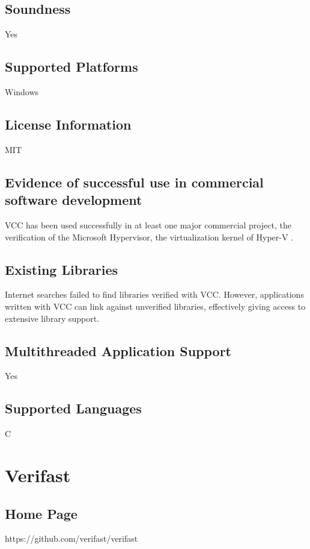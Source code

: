 \documentclass[12pt,openany,a4paper]{book}
\begin{document}
	\subsection{Soundness}
	Yes

	\subsection{Supported Platforms}
	Windows

	\subsection{License Information}
	MIT \cite{vcc01}

	\subsection{Evidence of successful use in commercial software development}
		VCC has been used successfully in at least one major commercial project, the verification of the Microsoft Hypervisor, the virtualization kernel of Hyper-V \cite{vcc2}.

	\subsection{Existing Libraries}
		Internet searches failed to find libraries verified with VCC. However, applications written with VCC can link against unverified libraries, effectively giving access to extensive library support.

	\subsection{Multithreaded Application Support}
	Yes

	\subsection{Supported Languages}
	C




\section{Verifast}
	\subsection{Home Page}%
	https://github.com/verifast/verifast
\end{document}
